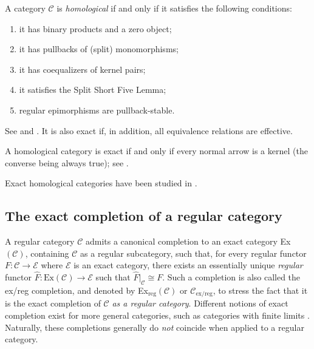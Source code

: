 \documentclass[12pt]{amsart}
\theoremstyle{definition}
\begin{document}
A category $\mathcal{C}$ is \emph{homological} if and only if it satisfies
the following conditions:

\begin{enumerate}
\item it has binary products and a zero object;

\item it has pullbacks of (split) monomorphisms;

\item it has coequalizers of kernel pairs;

\item it satisfies the Split Short Five Lemma;

\item regular epimorphisms are pullback-stable.
\end{enumerate}

See \cite[Section 2.5]{janelidze_semi-abelian_2002} and \cite[Chapters 3 and
4]{borceux_malcev_2004}. It is also exact if, in addition, all equivalence
relations are effective.

A homological category is exact if and only if every normal arrow is a
kernel (the converse being always true); see \cite%
{metere_bourn-normal_2017,bourn_normal_2000,bourn_direct_2005}.

Exact homological categories have been studied in \cite%
{bourn_direct_2005,everaert_baer_2004,everaert_baer_2004-1,gray_relative_2016,gray_complete_2022,bourn_protomodularity_1998}%
.

\subsection{The exact completion of a regular category}

A regular category $\mathcal{C}$ admits a canonical completion to an exact
category \textrm{Ex}$(\mathcal{C})$, containing $\mathcal{C}$ as a regular
subcategory, such that, for every regular functor $F:\mathcal{C}\rightarrow 
\mathcal{E}$ where $\mathcal{E}$ is an exact category, there exists an
essentially unique \emph{regular} functor $\hat{F}:\mathrm{Ex}\left( 
\mathcal{C}\right) \rightarrow \mathcal{E}$ such that $\hat{F}|_{\mathcal{C}%
}\cong F$. Such a completion is also called the ex/reg completion, and
denoted by \textrm{Ex}$_{\mathrm{reg}}\left( \mathcal{C}\right) $ or $%
\mathcal{C}_{\mathrm{ex/reg}}$, to stress the fact that it is the exact
completion of $\mathcal{C}$ \emph{as a regular category}. Different notions
of exact completion exist for more general categories, such as categories
with finite limits \cite{carboni_free_1982}. Naturally, these completions
generally do \emph{not} coincide when applied to a regular category.
\end{document}
